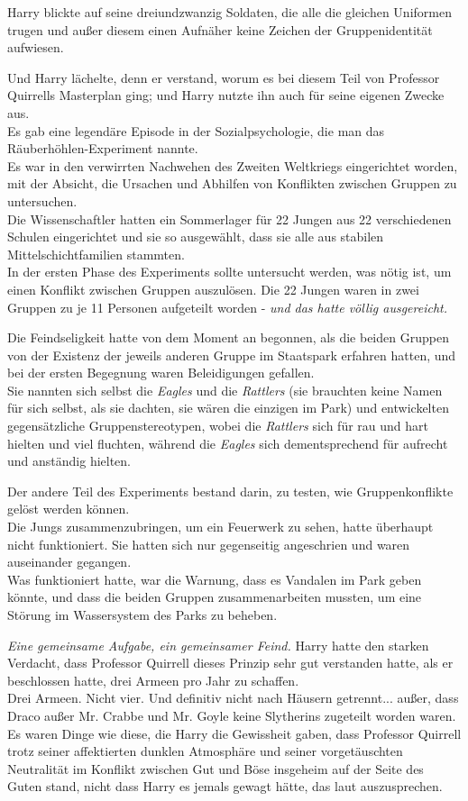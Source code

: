 {Harry blickte auf seine dreiundzwanzig Soldaten, die alle die gleichen Uniformen trugen und außer diesem einen Aufnäher keine Zeichen der Gruppenidentität aufwiesen.

Und Harry lächelte, denn er verstand, worum es bei diesem Teil von Professor Quirrells Masterplan ging; und Harry nutzte ihn auch für seine eigenen Zwecke aus.\\ Es gab eine legendäre Episode in der Sozialpsychologie, die man das Räuberhöhlen-Experiment nannte.\\ Es war in den verwirrten Nachwehen des Zweiten Weltkriegs eingerichtet worden, mit der Absicht, die Ursachen und Abhilfen von Konflikten zwischen Gruppen zu untersuchen.\\ Die Wissenschaftler hatten ein Sommerlager für 22 Jungen aus 22 verschiedenen Schulen eingerichtet und sie so ausgewählt, dass sie alle aus stabilen Mittelschichtfamilien stammten.\\ In der ersten Phase des Experiments sollte untersucht werden, was nötig ist, um einen Konflikt zwischen Gruppen auszulösen. Die 22 Jungen waren in zwei Gruppen zu je 11 Personen aufgeteilt worden - \emph{und das hatte völlig ausgereicht.}

Die Feindseligkeit hatte von dem Moment an begonnen, als die beiden Gruppen von der Existenz der jeweils anderen Gruppe im Staatspark erfahren hatten, und bei der ersten Begegnung waren Beleidigungen gefallen.\\ Sie nannten sich selbst die \emph{Eagles} und die \emph{Rattlers} (sie brauchten keine Namen für sich selbst, als sie dachten, sie wären die einzigen im Park) und entwickelten gegensätzliche Gruppenstereotypen, wobei die \emph{Rattlers} sich für rau und hart hielten und viel fluchten, während die \emph{Eagles} sich dementsprechend für aufrecht und anständig hielten.

Der andere Teil des Experiments bestand darin, zu testen, wie Gruppenkonflikte gelöst werden können.\\ Die Jungs zusammenzubringen, um ein Feuerwerk zu sehen, hatte überhaupt nicht funktioniert. Sie hatten sich nur gegenseitig angeschrien und waren auseinander gegangen.\\ Was funktioniert hatte, war die Warnung, dass es Vandalen im Park geben könnte, und dass die beiden Gruppen zusammenarbeiten mussten, um eine Störung im Wassersystem des Parks zu beheben.

\emph{Eine gemeinsame Aufgabe, ein gemeinsamer Feind.} Harry hatte den starken Verdacht, dass Professor Quirrell dieses Prinzip sehr gut verstanden hatte, als er beschlossen hatte, drei Armeen pro Jahr zu schaffen.\\ Drei Armeen. Nicht vier. Und definitiv nicht nach Häusern getrennt... außer, dass Draco außer Mr. Crabbe und Mr. Goyle keine Slytherins zugeteilt worden waren. Es waren Dinge wie diese, die Harry die Gewissheit gaben, dass Professor Quirrell trotz seiner affektierten dunklen Atmosphäre und seiner vorgetäuschten Neutralität im Konflikt zwischen Gut und Böse insgeheim auf der Seite des Guten stand, nicht dass Harry es jemals gewagt hätte, das laut auszusprechen.

}
